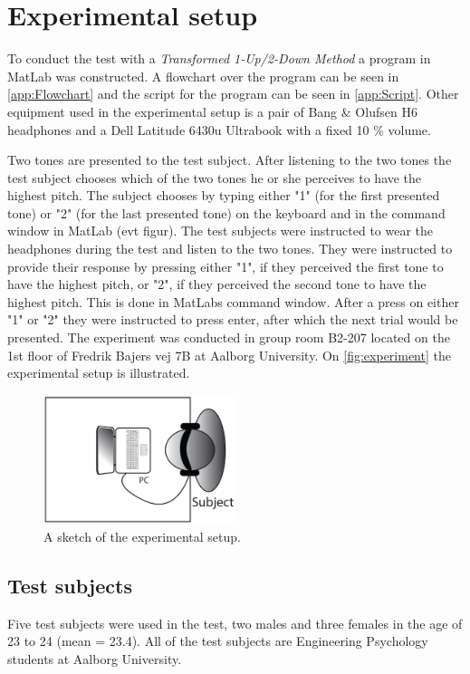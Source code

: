 \section*{Experimental setup}
%
To conduct the test with a \textit{Transformed 1-Up/2-Down Method} a program in MatLab was constructed. A flowchart over the program can be seen in \autoref{app:Flowchart} and the script for the program can be seen in \autoref{app:Script}. Other equipment used in the experimental setup is a pair of Bang $\&$ Olufsen H6 headphones and a Dell Latitude 6430u Ultrabook with a fixed 10 \% volume.

Two tones are presented to the test subject. After listening to the two tones the test subject chooses which of the two tones he or she perceives to have the highest pitch. The subject chooses by typing either "1" (for the first presented tone) or "2" (for the last presented tone) on the keyboard and in the command window in MatLab (evt figur).\blankline
%
% 
\noindent
The test subjects were instructed to wear the headphones during the test and listen to the two tones. They were instructed to provide their response by pressing either "1", if they perceived the first tone to have the highest pitch, or "2", if they perceived the second tone to have the highest pitch. This is done in MatLabs command window. After a press on either "1" or "2" they were instructed to press enter, after which the next trial would be presented.\blankline   
%
The experiment was conducted in group room B2-207 located on the 1st floor of Fredrik Bajers vej 7B at Aalborg University. On \autoref{fig:experiment} the experimental setup is illustrated. 
%
\begin{figure}[H]
\centering
\includegraphics[width = 0.5\textwidth]{Figure/experiment.png} 
\caption{A sketch of the experimental setup.}
\label{fig:experiment}
\end{figure}
%

\subsection*{Test subjects}
%
Five test subjects were used in the test, two males and three females in the age of 23 to 24 (mean = 23.4). All of the test subjects are Engineering Psychology students at Aalborg University. 